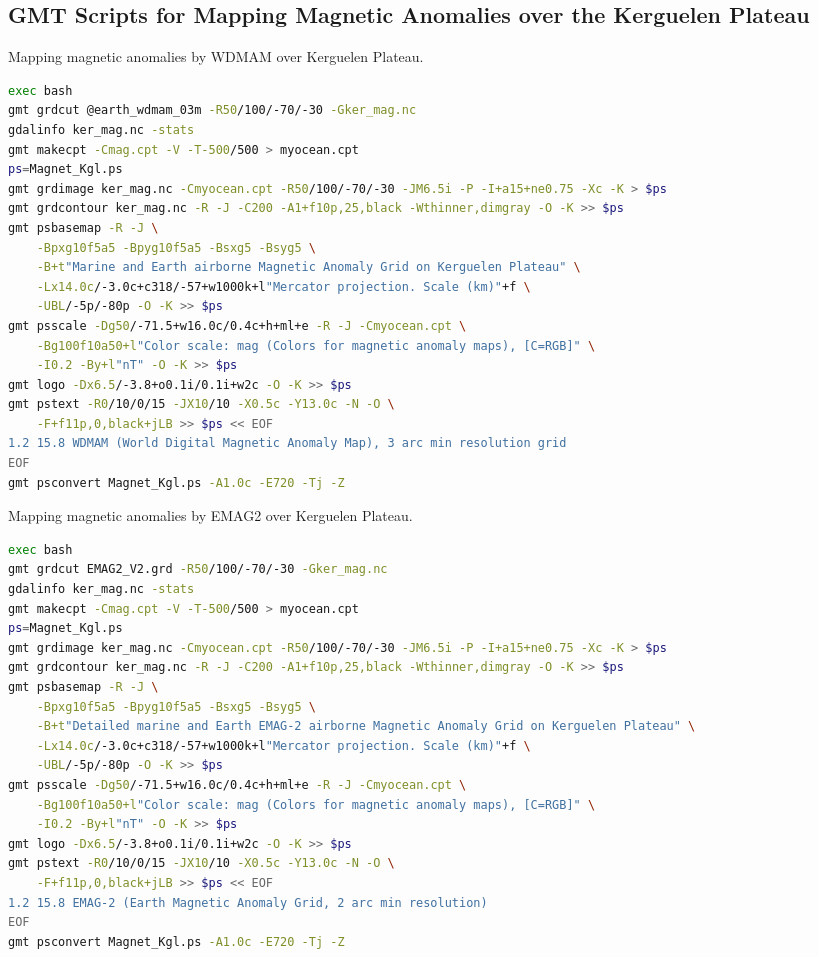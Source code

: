 \documentclass[geomatics,article,accept,pdftex,moreauthors]{Definitions/mdpi}
\begin{document}
\subsection[\appendixname~\thesubsection]{GMT Scripts for Mapping Magnetic Anomalies over the Kerguelen Plateau}
\vspace{-9pt}
\begin{listing}[H]
\caption{Mapping magnetic anomalies by WDMAM over Kerguelen Plateau.}
\label{lst09}
\begin{lstlisting}[xleftmargin=10pt,xrightmargin=3.5pt ,language=bash,caption={}]
exec bash
gmt grdcut @earth_wdmam_03m -R50/100/-70/-30 -Gker_mag.nc
gdalinfo ker_mag.nc -stats
gmt makecpt -Cmag.cpt -V -T-500/500 > myocean.cpt
ps=Magnet_Kgl.ps
gmt grdimage ker_mag.nc -Cmyocean.cpt -R50/100/-70/-30 -JM6.5i -P -I+a15+ne0.75 -Xc -K > $ps
gmt grdcontour ker_mag.nc -R -J -C200 -A1+f10p,25,black -Wthinner,dimgray -O -K >> $ps
gmt psbasemap -R -J \
    -Bpxg10f5a5 -Bpyg10f5a5 -Bsxg5 -Bsyg5 \
    -B+t"Marine and Earth airborne Magnetic Anomaly Grid on Kerguelen Plateau" \
    -Lx14.0c/-3.0c+c318/-57+w1000k+l"Mercator projection. Scale (km)"+f \
    -UBL/-5p/-80p -O -K >> $ps
gmt psscale -Dg50/-71.5+w16.0c/0.4c+h+ml+e -R -J -Cmyocean.cpt \
    -Bg100f10a50+l"Color scale: mag (Colors for magnetic anomaly maps), [C=RGB]" \
    -I0.2 -By+l"nT" -O -K >> $ps
gmt logo -Dx6.5/-3.8+o0.1i/0.1i+w2c -O -K >> $ps
gmt pstext -R0/10/0/15 -JX10/10 -X0.5c -Y13.0c -N -O \
    -F+f11p,0,black+jLB >> $ps << EOF
1.2 15.8 WDMAM (World Digital Magnetic Anomaly Map), 3 arc min resolution grid
EOF
gmt psconvert Magnet_Kgl.ps -A1.0c -E720 -Tj -Z
\end{lstlisting}
\end{listing}
\vspace{-18pt}
\begin{listing}[H]
\caption{Mapping magnetic anomalies by EMAG2 over Kerguelen Plateau.}
\label{lst10}
\begin{lstlisting}[xleftmargin=10pt,xrightmargin=3.5pt ,language=bash,caption={}]
exec bash
gmt grdcut EMAG2_V2.grd -R50/100/-70/-30 -Gker_mag.nc
gdalinfo ker_mag.nc -stats
gmt makecpt -Cmag.cpt -V -T-500/500 > myocean.cpt
ps=Magnet_Kgl.ps
gmt grdimage ker_mag.nc -Cmyocean.cpt -R50/100/-70/-30 -JM6.5i -P -I+a15+ne0.75 -Xc -K > $ps
gmt grdcontour ker_mag.nc -R -J -C200 -A1+f10p,25,black -Wthinner,dimgray -O -K >> $ps
gmt psbasemap -R -J \
    -Bpxg10f5a5 -Bpyg10f5a5 -Bsxg5 -Bsyg5 \
    -B+t"Detailed marine and Earth EMAG-2 airborne Magnetic Anomaly Grid on Kerguelen Plateau" \
    -Lx14.0c/-3.0c+c318/-57+w1000k+l"Mercator projection. Scale (km)"+f \
    -UBL/-5p/-80p -O -K >> $ps
gmt psscale -Dg50/-71.5+w16.0c/0.4c+h+ml+e -R -J -Cmyocean.cpt \
    -Bg100f10a50+l"Color scale: mag (Colors for magnetic anomaly maps), [C=RGB]" \
    -I0.2 -By+l"nT" -O -K >> $ps
gmt logo -Dx6.5/-3.8+o0.1i/0.1i+w2c -O -K >> $ps
gmt pstext -R0/10/0/15 -JX10/10 -X0.5c -Y13.0c -N -O \
    -F+f11p,0,black+jLB >> $ps << EOF
1.2 15.8 EMAG-2 (Earth Magnetic Anomaly Grid, 2 arc min resolution)
EOF
gmt psconvert Magnet_Kgl.ps -A1.0c -E720 -Tj -Z
\end{lstlisting}
\end{listing}
\end{document}
